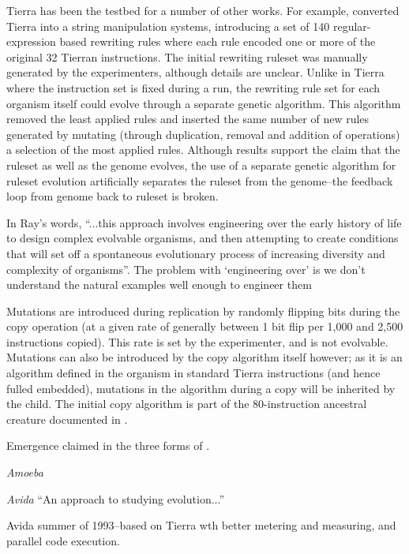 \begin{NOTES}
Tierra has been the testbed for a number of other works. For example, \cite{SugiuraSuzukiShioseEtAl2003} converted Tierra into a string manipulation systems, introducing a set of 140 regular-expression based rewriting rules where each rule encoded one or more of the original 32 Tierran instructions. The initial rewriting ruleset was manually generated by the experimenters, although details are unclear. Unlike in Tierra where the instruction set is fixed during a run, the rewriting rule set for each organism itself could evolve through a separate genetic algorithm. This algorithm removed the least applied rules and inserted the same number of new rules generated by mutating (through duplication, removal and addition of operations) a selection of the most applied rules. Although results support the claim that the ruleset as well as the genome evolves, the use of a separate genetic algorithm for ruleset evolution artificially separates the ruleset from the genome--the feedback loop from genome back to ruleset is broken.

In Ray's words, ``...this approach involves engineering over the early history of life to design complex evolvable organisms, and then attempting to create conditions that will set off a spontaneous evolutionary process of increasing diversity and complexity of organisms''\parencite{Taylor2001}. The problem with `engineering over' is we don't understand the natural examples well enough to engineer them \parencite{Taylor2001}

Mutations are introduced during replication by randomly flipping bits during the copy operation (at a given rate of generally between 1 bit flip per 1,000 and 2,500 instructions copied). This rate is set by the experimenter, and is not evolvable. Mutations can also be introduced by the copy algorithm itself however; as it is an algorithm defined in the organism in standard Tierra instructions (and hence fulled embedded), mutations in the algorithm during a copy will be inherited by the child. The initial copy algorithm is part of the 80-instruction ancestral creature documented in \cite[app.C]{Ray1991}.

Emergence claimed in the three forms of \cite{Cariani1991}.

\emph{Amoeba} \parencite{Pargellis2001}

\emph{Avida} \parencite{Ofria2004}
``An approach to studying evolution...''

Avida summer of 1993--based on Tierra wth better metering and measuring, and parallel code execution.


\end{NOTES}
